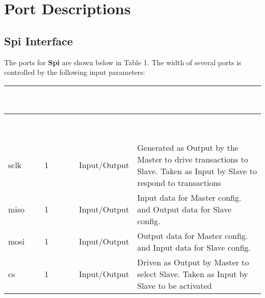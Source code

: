 \section{Port Descriptions}

\subsection{Spi Interface}

The ports for \textbf{Spi} are shown below in 
Table 1. The width of several ports is controlled 
by the following input parameters:

\renewcommand*{\arraystretch}{1.4}  %
 
\begingroup
\small

\begin{longtable}[H]{ 
  | p{}
  | p{}
  | p{}
  | p{} |
  }

\hline
\rowcolor{dark-gray}
\textcolor{white}{\textbf{Port Name}} & 
\textcolor{white}{\textbf{Width}} & 
\textcolor{white}{\textbf{Direction}} & 
\textcolor{white}{\textbf{Description}} \\ \hline
\endfirsthead

\hline
\rowcolor{dark-gray}
\textcolor{white}{\textbf{Port Name}} & 
\textcolor{white}{\textbf{Width}} & 
\textcolor{white}{\textbf{Direction}} & 
\textcolor{white}{\textbf{Description}}\\ \hline
\endhead

\hline
\endfoot

sclk &      
1 & 
Input/Output &     
Generated as Output by the Master to drive transactions to Slave. Taken as Input by Slave to respond to transactions\\ \hline

miso &       
1 & 
Input/Output &       
Input data for Master config. and Output data for Slave config. \\ \hline

mosi &        
1& 
Input/Output &       
Output data for Master config. and Input data for Slave config.\\ \hline

cs &      
1 & 
Input/Output &     
Driven as Output by Master to select Slave. Taken as Input by Slave to be activated\\ \hline


\end{longtable}
\captionsetup{aboveskip=0pt}
\label{table:ports}
\endgroup


